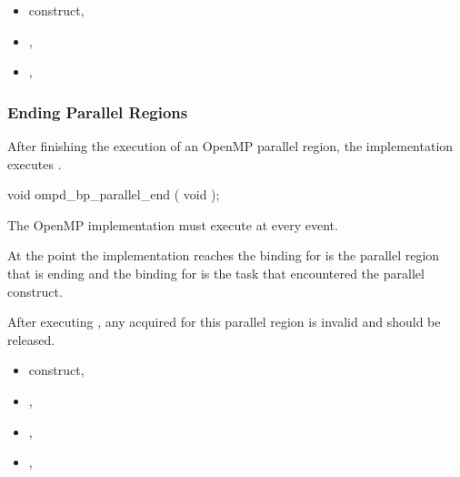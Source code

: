 \crossreferences

\begin{itemize}
\item
   construct, 
\item
  ,
\item
  , 
\end{itemize}





\subsubsection{Ending Parallel Regions}
\label{subsubsec:ompd_bp_parallel_end}

\summary
After finishing the execution of an OpenMP parallel region, the implementation executes
.


\format
\begin{cspecific}
\begin{ompSyntax}
void ompd_bp_parallel_end ( void );
\end{ompSyntax}
\end{cspecific}


\descr

The OpenMP implementation must execute 
 at every  event.

At the point the implementation reaches 
the binding for  is the parallel 
region that is ending and 
the binding for 
is the task that encountered the parallel construct.

After 
executing , any  acquired for this
parallel region is invalid and should be released.


\crossreferences
\begin{itemize}
\item
   construct, 
\item
  , 
\item
  , 
\item
  , 
\end{itemize}






